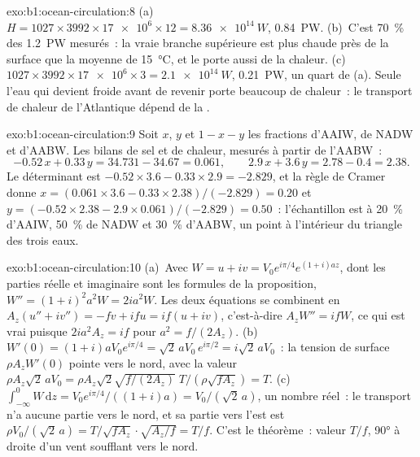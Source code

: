 \begin{solution}{exo:b1:ocean-circulation:8}
(a)~$H = 1027 \times 3992 \times \num{17e6} \times 12 = \qty{8.36e14}{W}$,
\qty{0.84}{PW}. (b)~C'est \qty{70}{\percent} des \qty{1.2}{PW} mesurés~: la vraie
branche supérieure est plus chaude près de la surface que la moyenne de \qty{15}{\celsius}, et le
 porte aussi de la chaleur. (c)~$1027 \times 3992 \times \num{17e6} \times 3 =
\qty{2.1e14}{W}$, \qty{0.21}{PW}, un quart de (a). Seule l'eau qui devient froide
avant de revenir porte beaucoup de chaleur~: le transport de chaleur de l'Atlantique dépend de
la .
\end{solution}

\begin{solution}{exo:b1:ocean-circulation:9}
Soit $x$, $y$ et $1 - x - y$ les fractions d'AAIW, de NADW et d'AABW. Les bilans de sel et de chaleur,
mesurés à partir de l'AABW~:
\[
  -0.52\,x + 0.33\,y = 34.731 - 34.67 = 0.061,\qquad
  2.9\,x + 3.6\,y = 2.78 - 0.4 = 2.38 .
\]
Le déterminant est $-0.52 \times 3.6 - 0.33 \times 2.9 = -2.829$, et la règle de Cramer
donne $x = (0.061 \times 3.6 - 0.33 \times 2.38)/(-2.829) = 0.20$ et $y = (-0.52
\times 2.38 - 2.9 \times 0.061)/(-2.829) = 0.50$~: l'échantillon est à \qty{20}{\percent}
d'AAIW, \qty{50}{\percent} de NADW et \qty{30}{\percent} d'AABW, un point à l'intérieur du
triangle des trois eaux.
\end{solution}

\begin{solution}{exo:b1:ocean-circulation:10}
(a)~Avec $W = u + iv = V_0e^{i\pi/4}e^{(1+i)az}$, dont les parties réelle et imaginaire sont
les formules de la proposition, $W'' = (1+i)^2a^2W = 2ia^2W$. Les deux équations
se combinent en $A_z(u'' + iv'') = -fv + ifu = if(u + iv)$, c'est-à-dire $A_zW'' = ifW$,
ce qui est vrai puisque $2ia^2A_z = if$ pour $a^2 = f/(2A_z)$. (b)~$W'(0) =
(1+i)aV_0e^{i\pi/4} = \sqrt2\,aV_0\,e^{i\pi/2} = i\sqrt2\,aV_0$~: la tension de surface
$\rho A_zW'(0)$ pointe vers le nord, avec la valeur $\rho A_z\sqrt2\,aV_0 = \rho A_z\sqrt2
\sqrt{f/(2A_z)}\;T/(\rho\sqrt{fA_z}) = T$. (c)~$\int_{-\infty}^0 W\,\mathrm dz =
V_0e^{i\pi/4}/((1+i)a) = V_0/(\sqrt2\,a)$, un nombre réel~: le transport n'a aucune
partie vers le nord, et sa partie vers l'est est $\rho V_0/(\sqrt2\,a) =
T/\sqrt{fA_z}\cdot\sqrt{A_z/f} = T/f$. C'est le théorème~: valeur $T/f$, \ang{90} à
droite d'un vent soufflant vers le nord.
\end{solution}

